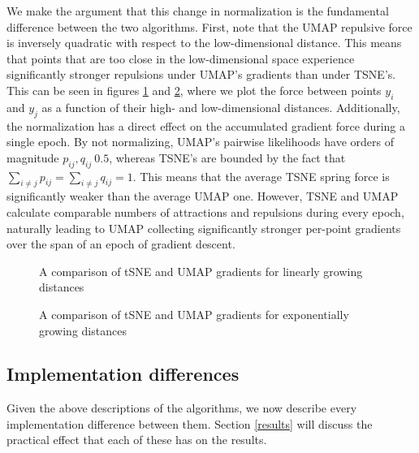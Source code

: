 \documentclass[sigconf, nonacm]{acmart}
\begin{document}
We make the argument that this change in normalization is the fundamental difference between the two algorithms. First, note that the UMAP repulsive force is
inversely quadratic with respect to the low-dimensional distance. This means that points that are too close in the low-dimensional space experience
significantly stronger repulsions under UMAP's gradients than under TSNE's. This can be seen in figures \ref{fig:linear_grads} and \ref{fig:exp_grads}, where we
plot the force between points $y_i$ and $y_j$ as a function of their high- and low-dimensional distances.
Additionally, the normalization has a direct effect on the accumulated gradient force during a single epoch.
By not normalizing, UMAP's pairwise likelihoods have orders of magnitude $p_{ij}, q_{ij} ~ 0.5$, whereas TSNE's are bounded by the fact that $\sum_{i \neq j}
p_{ij} = \sum_{i \neq j} q_{ij} = 1$.
This means that the average TSNE spring force is significantly weaker than the average UMAP one.
However, TSNE and UMAP calculate comparable numbers of attractions and repulsions during every epoch, naturally leading to UMAP collecting significantly
stronger per-point gradients over the span of an epoch of gradient descent.


\begin{figure}
\centering
	\qquad
	\caption{A comparison of tSNE and UMAP gradients for linearly growing distances}%
	\label{fig:linear_grads}%
\end{figure}

\begin{figure}
\centering
	\qquad
	\caption{A comparison of tSNE and UMAP gradients for exponentially growing distances}%
	\label{fig:exp_grads}%
\end{figure}

\subsection{Implementation differences} \label{implementation_diffs}
Given the above descriptions of the algorithms, we now describe every implementation difference between them. Section \ref{results} will discuss the
practical effect that each of these has on the results.
\end{document}
